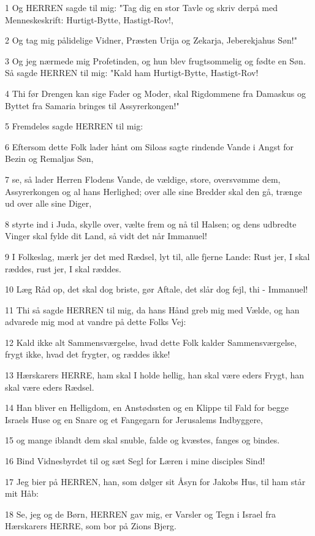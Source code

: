 \par 1 Og HERREN sagde til mig: "Tag dig en stor Tavle og skriv derpå med Menneskeskrift: Hurtigt-Bytte, Hastigt-Rov!,
\par 2 Og tag mig pålidelige Vidner, Præsten Urija og Zekarja, Jeberekjahus Søn!"
\par 3 Og jeg nærmede mig Profetinden, og hun blev frugtsommelig og fødte en Søn. Så sagde HERREN til mig: "Kald ham Hurtigt-Bytte, Hastigt-Rov!
\par 4 Thi før Drengen kan sige Fader og Moder, skal Rigdommene fra Damaskus og Byttet fra Samaria bringes til Assyrerkongen!"
\par 5 Fremdeles sagde HERREN til mig:
\par 6 Eftersom dette Folk lader hånt om Siloas sagte rindende Vande i Angst for Bezin og Remaljas Søn,
\par 7 se, så lader Herren Flodens Vande, de vældige, store, oversvømme dem, Assyrerkongen og al hans Herlighed; over alle sine Bredder skal den gå, trænge ud over alle sine Diger,
\par 8 styrte ind i Juda, skylle over, vælte frem og nå til Halsen; og dens udbredte Vinger skal fylde dit Land, så vidt det når Immanuel!
\par 9 I Folkeslag, mærk jer det med Rædsel, lyt til, alle fjerne Lande: Rust jer, I skal ræddes, rust jer, I skal ræddes.
\par 10 Læg Råd op, det skal dog briste, gør Aftale, det slår dog fejl, thi - Immanuel!
\par 11 Thi så sagde HERREN til mig, da hans Hånd greb mig med Vælde, og han advarede mig mod at vandre på dette Folks Vej:
\par 12 Kald ikke alt Sammensværgelse, hvad dette Folk kalder Sammensværgelse, frygt ikke, hvad det frygter, og ræddes ikke!
\par 13 Hærskarers HERRE, ham skal I holde hellig, han skal være eders Frygt, han skal være eders Rædsel.
\par 14 Han bliver en Helligdom, en Anstødssten og en Klippe til Fald for begge Israels Huse og en Snare og et Fangegarn for Jerusalems Indbyggere,
\par 15 og mange iblandt dem skal snuble, falde og kvæstes, fanges og bindes.
\par 16 Bind Vidnesbyrdet til og sæt Segl for Læren i mine disciples Sind!
\par 17 Jeg bier på HERREN, han, som dølger sit Åsyn for Jakobs Hus, til ham står mit Håb:
\par 18 Se, jeg og de Børn, HERREN gav mig, er Varsler og Tegn i Israel fra Hærskarers HERRE, som bor på Zions Bjerg.
